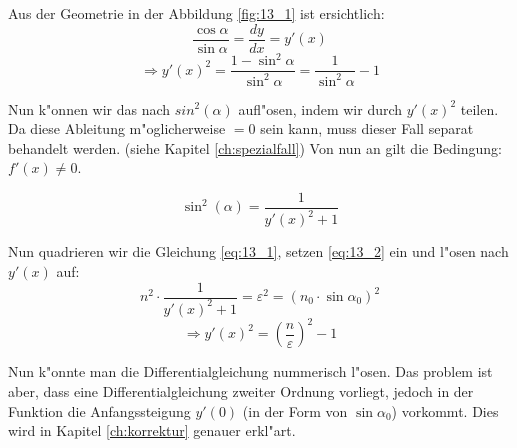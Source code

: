 Aus der Geometrie in der Abbildung \ref{fig:13_1} ist ersichtlich:
$$\frac{\cos \alpha}{\sin \alpha} = \frac{dy}{dx} = y'(x)$$
$$\Rightarrow y'(x)^2 = \frac{1 - \sin^2 \alpha}{\sin^2 \alpha} = \frac{1}{\sin^2
\alpha} - 1$$

Nun k"onnen wir das nach $sin^2(\alpha)$ aufl"osen, indem wir durch $y'(x)^2$ teilen. Da
diese Ableitung m"oglicherweise $=0$ sein kann, muss dieser Fall separat behandelt werden.
(siehe Kapitel \ref{ch:spezialfall}) Von nun an gilt die Bedingung: $f'(x) \neq 0$.

\begin{equation} \label{eq:13_2}
\sin^2 (\alpha) = \frac{1}{y'(x)^2 + 1}
\end{equation}

Nun quadrieren wir die Gleichung \ref{eq:13_1}, setzen \ref{eq:13_2} ein und l"osen
nach $y'(x)$ auf:
\begin{equation} \label{eq:13_3}
n^2 \cdot \frac{1}{y'(x)^2 + 1} = \varepsilon^2 = (n_0 \cdot \sin \alpha_0)^2
\end{equation}
\begin{equation} \label{eq:13_4}
\Rightarrow y'(x)^2 = \left( \frac{n}{\varepsilon} \right)^2 - 1
\end{equation}

Nun k"onnte man die Differentialgleichung nummerisch l"osen. Das problem ist aber, dass 
eine Differentialgleichung zweiter Ordnung vorliegt, jedoch in der Funktion die
Anfangssteigung $y'(0)$ (in der Form von $\sin \alpha_0$) vorkommt. Dies wird in Kapitel
\ref{ch:korrektur} genauer erkl"art.

